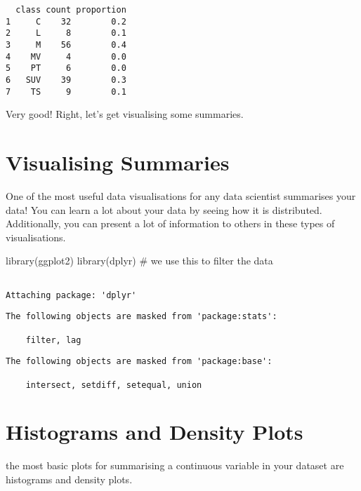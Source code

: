 \documentclass[
  letterpaper,
  DIV=11,
  numbers=noendperiod]{scrreprt}
\newenvironment{Shaded}{\begin{snugshade}}{\end{snugshade}}
\newcommand{\CommentTok}[1]{\textcolor[rgb]{0.37,0.37,0.37}{#1}}
\newcommand{\FunctionTok}[1]{\textcolor[rgb]{0.28,0.35,0.67}{#1}}
\newcommand{\NormalTok}[1]{\textcolor[rgb]{0.00,0.23,0.31}{#1}}
\begin{document}
\begin{verbatim}
  class count proportion
1     C    32        0.2
2     L     8        0.1
3     M    56        0.4
4    MV     4        0.0
5    PT     6        0.0
6   SUV    39        0.3
7    TS     9        0.1
\end{verbatim}

Very good! Right, let's get visualising some summaries.

\section{Visualising Summaries}\label{visualising-summaries}

One of the most useful data visualisations for any data scientist
summarises your data! You can learn a lot about your data by seeing how
it is distributed. Additionally, you can present a lot of information to
others in these types of visualisations.

\begin{Shaded}
\begin{Highlighting}[]
\FunctionTok{library}\NormalTok{(ggplot2)}
\FunctionTok{library}\NormalTok{(dplyr) }\CommentTok{\# we use this to filter the data}
\end{Highlighting}
\end{Shaded}

\begin{verbatim}

Attaching package: 'dplyr'
\end{verbatim}

\begin{verbatim}
The following objects are masked from 'package:stats':

    filter, lag
\end{verbatim}

\begin{verbatim}
The following objects are masked from 'package:base':

    intersect, setdiff, setequal, union
\end{verbatim}

\section{Histograms and Density
Plots}\label{histograms-and-density-plots}

the most basic plots for summarising a continuous variable in your
dataset are histograms and density plots.
\end{document}

